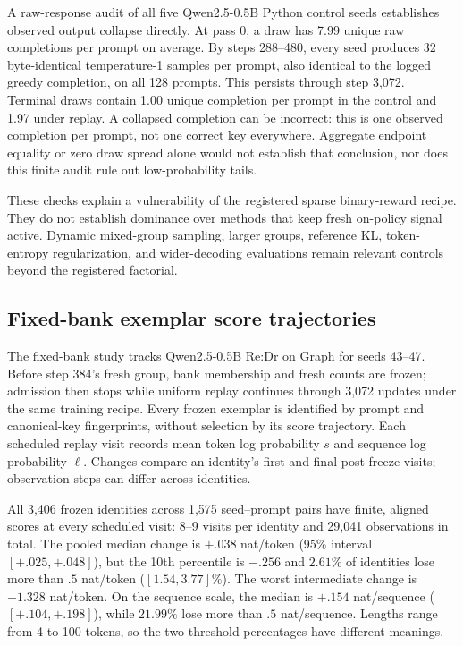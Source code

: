 \documentclass{article}
\newcommand{\1}{\mathbf 1}
\theoremstyle{remark}
\theoremstyle{definition}
\theoremstyle{plain}
\begin{document}
A raw-response audit of all five Qwen2.5-0.5B Python control seeds establishes
observed output collapse directly. At pass 0, a draw has 7.99 unique raw
completions per prompt on average. By steps 288--480, every seed produces
32 byte-identical temperature-1 samples per prompt, also identical to the
logged greedy completion, on all 128 prompts. This persists through step
3,072. Terminal draws contain 1.00 unique completion per prompt in the
control and 1.97 under replay. A collapsed completion can be incorrect:
this is one observed completion per prompt, not one correct key everywhere.
Aggregate endpoint equality or zero draw spread alone would not establish
that conclusion, nor does this finite audit rule out low-probability tails.

These checks explain a vulnerability of the registered sparse binary-reward
recipe. They do not establish dominance over methods that keep fresh
on-policy signal active. Dynamic mixed-group sampling, larger groups,
reference KL, token-entropy regularization, and wider-decoding evaluations
remain relevant controls beyond the registered factorial.

\subsection{Fixed-bank exemplar score trajectories}
\label{app:fixed-bank-survival}

The fixed-bank study tracks Qwen2.5-0.5B Re:Dr on Graph for seeds
43--47. Before step 384's fresh group, bank membership and fresh counts
are frozen; admission then stops while uniform replay continues through
3,072 updates under the same training recipe. Every frozen exemplar is
identified by prompt and canonical-key fingerprints, without selection by
its score trajectory. Each scheduled replay visit records mean token log
probability $s$ and sequence log probability $\ell$. Changes compare an
identity's first and final post-freeze visits; observation steps can differ
across identities.

All 3,406 frozen identities across 1,575 seed--prompt pairs have finite,
aligned scores at every scheduled visit: 8--9 visits per identity and
29,041 observations in total. The pooled median change is $+.038$
nat/token (95\% interval $[+.025,+.048]$), but the 10th percentile is
$-.256$ and $2.61\%$ of identities lose more than $.5$ nat/token
($[1.54,3.77]\%$). The worst intermediate change is $-1.328$ nat/token.
On the sequence scale, the median is $+.154$ nat/sequence
($[+.104,+.198]$), while $21.99\%$ lose more than $.5$ nat/sequence.
Lengths range from 4 to 100 tokens, so the two threshold percentages have
different meanings.
\end{document}
